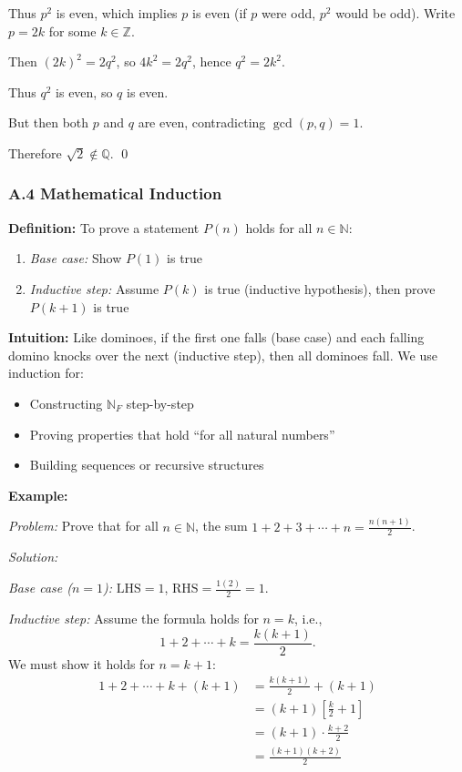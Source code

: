 Thus $p^2$ is even, which implies $p$ is even (if $p$ were odd, $p^2$ would be odd). Write $p = 2k$ for some $k \in \mathbb{Z}$. 

Then $(2k)^2 = 2q^2$, so $4k^2 = 2q^2$, hence $q^2 = 2k^2$. 

Thus $q^2$ is even, so $q$ is even. 

But then both $p$ and $q$ are even, contradicting $\gcd(p,q) = 1$. 

Therefore $\sqrt{2} \notin \mathbb{Q}$. \qed

\subsubsection*{A.4 Mathematical Induction}

\textbf{Definition:}
To prove a statement $P(n)$ holds for all $n \in \mathbb{N}$:
\begin{enumerate}
    \item \textit{Base case:} Show $P(1)$ is true
    \item \textit{Inductive step:} Assume $P(k)$ is true (inductive hypothesis), then prove $P(k+1)$ is true
\end{enumerate}

\textbf{Intuition:}
Like dominoes, if the first one falls (base case) and each falling domino knocks over the next (inductive step), then all dominoes fall. We use induction for:
\begin{itemize}
    \item Constructing $\mathbb{N}_F$ step-by-step
    \item Proving properties that hold ``for all natural numbers''
    \item Building sequences or recursive structures
\end{itemize}

\textbf{Example:}

\textit{Problem:} Prove that for all $n \in \mathbb{N}$, the sum $1 + 2 + 3 + \cdots + n = \frac{n(n+1)}{2}$.

\textit{Solution:} 

\textit{Base case ($n=1$):} $\text{LHS} = 1$, $\text{RHS} = \frac{1(2)}{2} = 1$. \checkmark

\textit{Inductive step:} Assume the formula holds for $n = k$, i.e., 
\[1 + 2 + \cdots + k = \frac{k(k+1)}{2}.\]
We must show it holds for $n = k+1$:
\begin{align*}
1 + 2 + \cdots + k + (k+1) &= \frac{k(k+1)}{2} + (k+1) \\
&= (k+1)\left[\frac{k}{2} + 1\right] \\
&= (k+1)\cdot\frac{k+2}{2} \\
&= \frac{(k+1)(k+2)}{2}
\end{align*}

